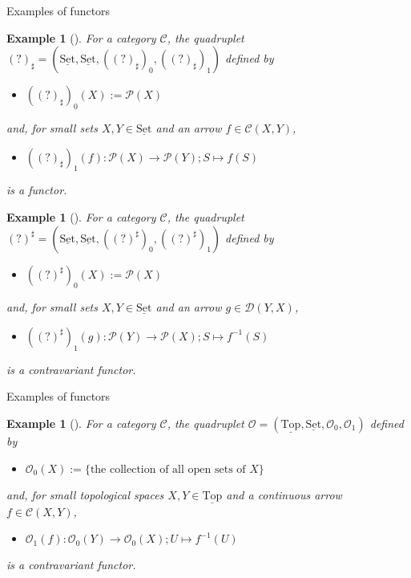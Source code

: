 \documentclass[dvipdfmx,10pt,notheorems]{beamer}
\newtheorem{example}[theorem]{Example}
\renewcommand{\#}{^\sharp}
\begin{document}
	\begin{frame}{Examples of functors}
			\begin{example}[]
					For a category $\mathcal{C}$, the quadruplet $(?)_\sharp=(\underline{\mathrm{Set}},
					\underline{\mathrm{Set}},
					((?)_\sharp)_0,((?)_\sharp)_1)$ defined by
							\begin{itemize}
									\item $((?)_\sharp)_0(X):=\mathcal{P}(X)$
							\end{itemize}
					and, for small sets $X,Y\in\underline{\mathrm{Set}}$ and an arrow $f\in\mathcal{C}(X,Y)$,
							\begin{itemize}
									\item $((?)_\sharp)_1(f):\mathcal{P}(X)\rightarrow\mathcal{P}(Y);S\mapsto f(S)
									$
							\end{itemize}
					is a functor.
			\end{example}
			\begin{example}[]
					For a category $\mathcal{C}$, the quadruplet $(?)^\sharp=(\underline{\mathrm{Set}},
					\underline{\mathrm{Set}},
					((?)^\sharp)_0,((?)^\sharp)_1)$ defined by
							\begin{itemize}
									\item $((?)^\sharp)_0(X):=\mathcal{P}(X)$
							\end{itemize}
					and, for small sets $X,Y\in\underline{\mathrm{Set}}$ and an arrow $g\in\mathcal{D}(Y,X)$,
							\begin{itemize}
									\item $((?)^\sharp)_1(g):\mathcal{P}(Y)\rightarrow\mathcal{P}(X);S\mapsto f^{-1}(S)
									$
							\end{itemize}
					is a contravariant functor.
			\end{example}
	\end{frame}



	\begin{frame}{Examples of functors}
			\begin{example}[]
					For a category $\mathcal{C}$, the quadruplet $\mathcal{O}=(\underline{\mathrm{Top}},
					\underline{\mathrm{Set}},
					\mathcal{O}_0,\mathcal{O}_1)$ defined by
							\begin{itemize}
									\item $\mathcal{O}_0(X):=\{\mbox{the collection of all open sets of }X\}$
							\end{itemize}
					and, for small topological spaces $X,Y\in\underline{\mathrm{Top}}$ and
					a continuous arrow $f\in\mathcal{C}(X,Y)$,
							\begin{itemize}
									\item $\mathcal{O}_1(f):
									\mathcal{O}_0(Y)\rightarrow \mathcal{O}_0(X);U\mapsto f^{-1}(U)
									$
							\end{itemize}
					is a contravariant functor.
			\end{example}
	\end{frame}
\end{document}
